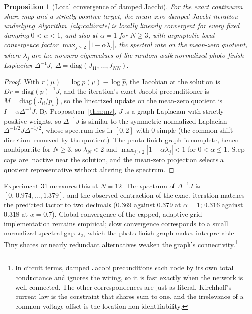 \documentclass[12pt]{article}
\newtheorem{proposition}{Proposition}
\theoremstyle{remark}
\begin{document}
\begin{proposition}[Local convergence of damped Jacobi]
\label{prop:jacobi}
For the exact continuum share map and a strictly positive target, the
mean-zero damped Jacobi iteration underlying
Algorithm~\ref{alg:calibrate} is locally linearly convergent for every
fixed damping $0 < \alpha < 1$, and also at $\alpha = 1$ for $N \ge 3$,
with asymptotic local convergence factor
$\max_{j \ge 2} |1 - \alpha \lambda_j|$, the spectral rate on the
mean-zero quotient,
where $\lambda_j$ are the nonzero eigenvalues of the random-walk
normalized photo-finish Laplacian $\Delta^{-1} J$,
$\Delta = \mathrm{diag}(J_{11}, \dots, J_{NN})$.
\end{proposition}

\begin{proof}
With $r(\mu) = \log p(\mu) - \log \hat p$, the Jacobian at the
solution is $Dr = \mathrm{diag}(p)^{-1} J$, and the iteration's exact
Jacobi preconditioner is $M = \mathrm{diag}(J_{ii}/p_i)$, so the
linearized update on the mean-zero quotient is $I - \alpha
\Delta^{-1} J$. By Proposition~\ref{thm:inv}, $J$ is a graph Laplacian
with strictly positive weights, so $\Delta^{-1} J$ is similar to the
symmetric normalized Laplacian $\Delta^{-1/2} J \Delta^{-1/2}$, whose
spectrum lies in $[0, 2]$ with $0$ simple (the common-shift direction,
removed by the quotient). The photo-finish graph is complete, hence
nonbipartite for $N \ge 3$, so $\lambda_N < 2$ and $\max_{j\ge2} |1 -
\alpha \lambda_j| < 1$ for $0 < \alpha \le 1$. Step caps are inactive
near the solution, and the mean-zero projection selects a quotient
representative without altering the spectrum.
\end{proof}

Experiment 31 measures this at $N = 12$. The spectrum of $\Delta^{-1}J$ is
$[0,\, 0.974, \dots, 1.379]$, and the observed contraction of the
exact iteration matches the predicted factor to two decimals ($0.369$
against $0.379$ at $\alpha = 1$; $0.316$ against $0.318$ at $\alpha =
0.7$). Global convergence of the capped, adaptive-grid implementation
remains empirical; slow convergence corresponds to a small normalized
spectral gap $\lambda_2$, which the photo-finish graph makes
interpretable. Tiny shares or nearly redundant alternatives weaken the
graph's connectivity.\footnote{In circuit terms, damped Jacobi
preconditions each node by its own total conductance and ignores the
wiring, so it is fast exactly when the network is well connected. The
other correspondences are just as literal. Kirchhoff's current law is
the constraint that shares sum to one, and the irrelevance of a common
voltage offset is the location non-identifiability.}
\end{document}
